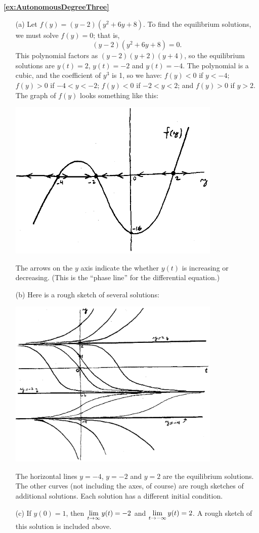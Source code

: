 \medskip
\textbf{\ref{ex:AutonomousDegreeThree}}
\begin{enumerate}
\item[(a)]
Let $f(y) = (y-2)(y^2+6y+8)$.
To find the equilibrium solutions, we must solve
$f(y)=0$; that is,
\[
   (y-2)(y^2+6y+8) = 0.
\]
This polynomial factors as $(y-2)(y+2)(y+4)$, so the
equilibrium solutions are $y(t)=2$, $y(t)=-2$ and $y(t)=-4$.
The polynomial is a cubic, and the coefficient of $y^3$ is 1,
so we have: $f(y) < 0$ if $y < -4$;
$f(y) > 0$ if $-4 < y < -2$;
$f(y) < 0$ if $-2 < y < 2$; and
$f(y) > 0$ if $y > 2$.
The graph of $f(y)$ looks something like this:

\centerline{\includegraphics[width=4in]{images/AutonomousDegreeThreePlota.eps}}

The arrows on the $y$ axis indicate the whether
$y(t)$ is increasing or decreasing.
(This is the ``phase line'' for the differential equation.)

\item[(b)]
Here is a rough sketch of several solutions:

\centerline{\includegraphics[width=4in]{images/AutonomousDegreeThreePlotb.eps}}

The horizontal lines $y=-4$, $y=-2$ and $y=2$ are the
equilibrium solutions.  The other curves
(not including the axes, of course) are rough sketches
of additional solutions.
Each solution has a different initial condition.
\item[(c)]
If $y(0)=1$, then $\displaystyle \lim_{t\rightarrow\infty} y(t) = -2$
and $\displaystyle \lim_{t\rightarrow -\infty} y(t) = 2$.
A rough sketch of this solution is included above.
\end{enumerate}

